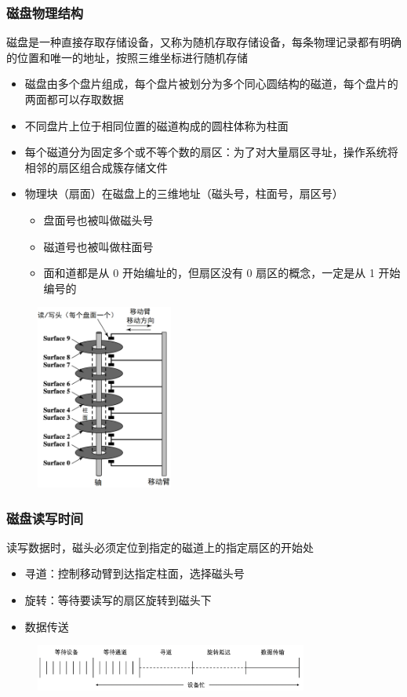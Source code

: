 \documentclass[cs4size,a4paper,10pt]{ctexart}
\begin{document}
	\subsubsection{磁盘物理结构}
	磁盘是一种直接存取存储设备，又称为随机存取存储设备，每条物理记录都有明确的位置和唯一的地址，按照三维坐标进行随机存储
	\begin{itemize}
		\item 磁盘由多个盘片组成，每个盘片被划分为多个同心圆结构的磁道，每个盘片的两面都可以存取数据
		\item 不同盘片上位于相同位置的磁道构成的圆柱体称为柱面
		\item 每个磁道分为固定多个或不等个数的扇区：为了对大量扇区寻址，操作系统将相邻的扇区组合成簇存储文件
		\item 物理块（扇面）在磁盘上的三维地址（磁头号，柱面号，扇区号）
		\begin{itemize}
			\item 盘面号也被叫做磁头号
			\item 磁道号也被叫做柱面号
			\item 面和道都是从 0 开始编址的，但扇区没有 0 扇区的概念，一定是从 1 开始编号的
		\end{itemize}
	\end{itemize}
	\begin{figure}[H]
		\centering
		\includegraphics[width=0.4\textwidth]{img/4.4.1.1}
	\end{figure}
	
	\subsubsection{磁盘读写时间}
	读写数据时，磁头必须定位到指定的磁道上的指定扇区的开始处
	\begin{itemize}
		\item 寻道：控制移动臂到达指定柱面，选择磁头号
		\item 旋转：等待要读写的扇区旋转到磁头下
		\item 数据传送
	\end{itemize}
	\begin{figure}[H]
		\centering
		\includegraphics[width=0.8\textwidth]{img/4.4.1.2}
	\end{figure}
\end{document}
